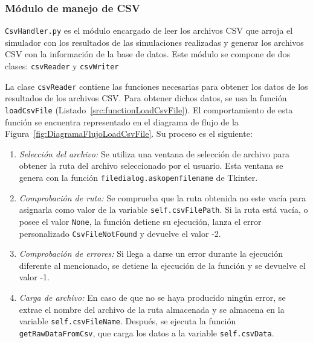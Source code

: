 
\subsubsection{Módulo de manejo de CSV}

\texttt{CsvHandler.py} es el módulo encargado de leer los archivos \acrshort{CSV} que arroja el simulador con los resultados de las simulaciones realizadas y generar los archivos \acrshort{CSV} con la información de la base de datos. Este módulo se compone de dos clases: \texttt{csvReader} y \texttt{csvWriter}

La clase \texttt{csvReader} contiene las funciones necesarias para obtener los datos de los resultados de los archivos \acrshort{CSV}. Para obtener dichos datos, se usa la función \texttt{loadCsvFile} (Listado~\ref{src:functionLoadCsvFile}). El comportamiento de esta función se encuentra representado en el diagrama de flujo de la Figura~\ref{fig:DiagramaFlujoLoadCsvFile}. Su proceso es el siguiente:
\begin{enumerate}
    \item \textit{Selección del archivo:} Se utiliza una ventana de selección de archivo para obtener la ruta del archivo seleccionado por el usuario. Esta ventana se genera con la función \texttt{filedialog.askopenfilename} de Tkinter.
    \item \textit{Comprobación de ruta:} Se comprueba que la ruta obtenida no este vacía para asignarla como valor de la variable \texttt{self.csvFilePath}. Si la ruta está vacía, o posee el valor \texttt{None}, la función detiene su ejecución, lanza el error personalizado \texttt{CsvFileNotFound} y devuelve el valor -2.
    \item \textit{Comprobación de errores:} Si llega a darse un error durante la ejecución diferente al mencionado, se detiene la ejecución de la función y se devuelve el valor -1.
    \item \textit{Carga de archivo:} En caso de que no se haya producido ningún error, se extrae el nombre del archivo de la ruta almacenada y se almacena en la variable \texttt{self.csvFileName}. Después, se ejecuta la función \texttt{getRawDataFromCsv}, que carga los datos a la variable \texttt{self.csvData}.
\end{enumerate}

